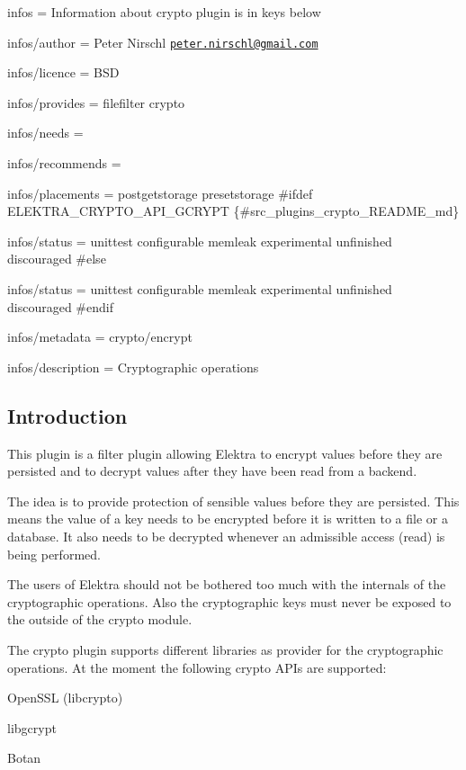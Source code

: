 
\begin{DoxyItemize}
\item infos = Information about crypto plugin is in keys below
\item infos/author = Peter Nirschl \href{mailto:peter.nirschl@gmail.com}{\tt peter.\+nirschl@gmail.\+com}
\item infos/licence = B\+S\+D
\item infos/provides = filefilter crypto
\item infos/needs =
\item infos/recommends =
\item infos/placements = postgetstorage presetstorage \#ifdef E\+L\+E\+K\+T\+R\+A\+\_\+\+C\+R\+Y\+P\+T\+O\+\_\+\+A\+P\+I\+\_\+\+G\+C\+R\+Y\+P\+T \{\#src\+\_\+plugins\+\_\+crypto\+\_\+\+R\+E\+A\+D\+M\+E\+\_\+md\}
\item infos/status = unittest configurable memleak experimental unfinished discouraged \#else
\item infos/status = unittest configurable memleak experimental unfinished discouraged \#endif
\item infos/metadata = crypto/encrypt
\item infos/description = Cryptographic operations
\end{DoxyItemize}

\subsection*{Introduction}

This plugin is a filter plugin allowing Elektra to encrypt values before they are persisted and to decrypt values after they have been read from a backend.

The idea is to provide protection of sensible values before they are persisted. This means the value of a key needs to be encrypted before it is written to a file or a database. It also needs to be decrypted whenever an admissible access (read) is being performed.

The users of Elektra should not be bothered too much with the internals of the cryptographic operations. Also the cryptographic keys must never be exposed to the outside of the crypto module.

The crypto plugin supports different libraries as provider for the cryptographic operations. At the moment the following crypto A\+P\+Is are supported\+:


\begin{DoxyItemize}
\item Open\+S\+S\+L ({\ttfamily libcrypto})
\item libgcrypt
\item Botan
\end{DoxyItemize}

